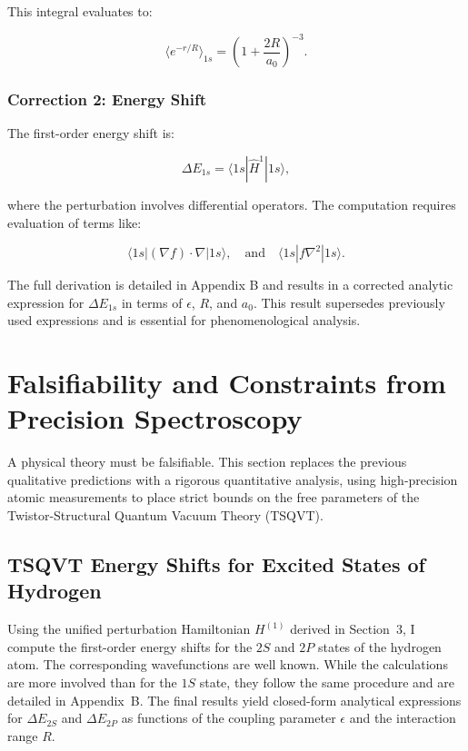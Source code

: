 \documentclass[a4paper]{article}
\begin{document}
This integral evaluates to:

\begin{equation}
	\langle e^{-r/R} \rangle_{1s} = \left( 1 + \frac{2R}{a_0} \right)^{-3}.
\end{equation}

\subsubsection*{Correction 2: Energy Shift}

The first-order energy shift is:

\begin{equation}
	\Delta E_{1s} = \langle 1s | \hat{H}^1 | 1s \rangle,
\end{equation}

where the perturbation involves differential operators. The computation requires evaluation of terms like:

\begin{equation}
	\langle 1s | (\nabla f) \cdot \nabla | 1s \rangle, \quad \text{and} \quad \langle 1s | f \nabla^2 | 1s \rangle.
\end{equation}

The full derivation is detailed in Appendix B and results in a corrected analytic expression for \( \Delta E_{1s} \) in terms of \( \epsilon \), \( R \), and \( a_0 \). This result supersedes previously used expressions and is essential for phenomenological analysis.

\section{Falsifiability and Constraints from Precision Spectroscopy}

A physical theory must be falsifiable. This section replaces the previous qualitative predictions with a rigorous quantitative analysis, using high-precision atomic measurements to place strict bounds on the free parameters of the Twistor-Structural Quantum Vacuum Theory (TSQVT).

\subsection{TSQVT Energy Shifts for Excited States of Hydrogen}

Using the unified perturbation Hamiltonian $H^{(1)}$ derived in Section~3, I compute the first-order energy shifts for the $2S$ and $2P$ states of the hydrogen atom. The corresponding wavefunctions are well known. While the calculations are more involved than for the $1S$ state, they follow the same procedure and are detailed in Appendix~B. The final results yield closed-form analytical expressions for $\Delta E_{2S}$ and $\Delta E_{2P}$ as functions of the coupling parameter $\epsilon$ and the interaction range $R$.
\end{document}

